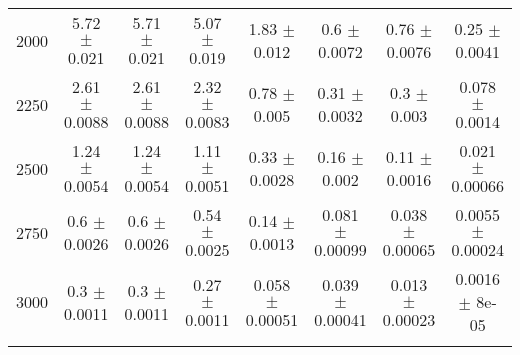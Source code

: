 \begin{footnotesize}
\begin{tabular}{c|c|c|c|c|c|c|c}
2000 & 5.72 $\pm$ 0.021 & 5.71 $\pm$ 0.021 & 5.07 $\pm$ 0.019 & 1.83 $\pm$ 0.012 & 0.6 $\pm$ 0.0072 & 0.76 $\pm$ 0.0076 & 0.25 $\pm$ 0.0041\\ 
2250 & 2.61 $\pm$ 0.0088 & 2.61 $\pm$ 0.0088 & 2.32 $\pm$ 0.0083 & 0.78 $\pm$ 0.005 & 0.31 $\pm$ 0.0032 & 0.3 $\pm$ 0.003 & 0.078 $\pm$ 0.0014\\ 
2500 & 1.24 $\pm$ 0.0054 & 1.24 $\pm$ 0.0054 & 1.11 $\pm$ 0.0051 & 0.33 $\pm$ 0.0028 & 0.16 $\pm$ 0.002 & 0.11 $\pm$ 0.0016 & 0.021 $\pm$ 0.00066\\ 
2750 & 0.6 $\pm$ 0.0026 & 0.6 $\pm$ 0.0026 & 0.54 $\pm$ 0.0025 & 0.14 $\pm$ 0.0013 & 0.081 $\pm$ 0.00099 & 0.038 $\pm$ 0.00065 & 0.0055 $\pm$ 0.00024\\ 
3000 & 0.3 $\pm$ 0.0011 & 0.3 $\pm$ 0.0011 & 0.27 $\pm$ 0.0011 & 0.058 $\pm$ 0.00051 & 0.039 $\pm$ 0.00041 & 0.013 $\pm$ 0.00023 & 0.0016 $\pm$ 8e-05\\ 
& & & & & & &\\ 
\hline\hline 
\end{tabular} 
\end{footnotesize} 
\newline 
